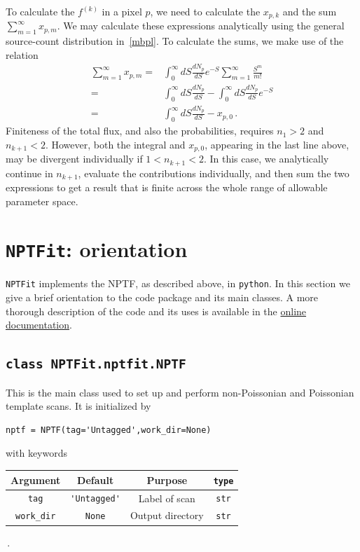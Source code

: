To calculate the $f^{(k)}$ in a pixel $p$, we need to calculate the $x_{p,k}$ and the sum $\sum_{m=1}^\infty x_{p,m}$.  We may calculate these expressions analytically using the general source-count distribution in~\eqref{mbpl}.  To calculate the sums, we make use of the relation 
\begin{equation}\begin{aligned}
\sum_{m=1}^{\infty} x_{p,m} = &\int_0^{\infty} dS \frac{dN_p}{dS} e^{-S} \sum_{m=1}^{\infty} \frac{S^m}{m!} \\
= &\int_0^{\infty} dS \frac{dN_p}{dS} - \int_0^{\infty} dS \frac{dN_p}{dS} e^{-S} \\
= &\int_0^{\infty} dS \frac{dN_p}{dS} - x_{p,0}\,.
\end{aligned}
\label{eq:xmsum}
\end{equation}
Finiteness of the total flux, and also the probabilities, requires $n_1 > 2$ and $n_{k+1} < 2$.  However,  
both the integral and $x_{p,0}$, appearing in the last line above, may be divergent individually if $1 < n_{k+1} < 2$.  In this case, we analytically continue in $n_{k+1}$, evaluate the contributions individually, and then sum the two expressions to get a result that is finite across the whole range of allowable parameter space. %

\section{\texttt{NPTFit}: orientation}
\label{NPTFit-orientation}

\texttt{NPTFit} implements the NPTF, as described above, in \texttt{python}.  In this section we give a brief orientation to the code package and its main classes.  A more thorough description of the code and its uses is available in the \href{http://nptfit.readthedocs.io}{online documentation}.

\subsection*{ \lstinline{class NPTFit.nptfit.NPTF} }

This is the main class used to set up and perform non-Poissonian and Poissonian template scans.  It is initialized by   
\begin{lstlisting}
nptf = NPTF(tag='Untagged',work_dir=None)
\end{lstlisting}
with keywords 
\begin{center}
\begin{tabular}{ cccc}
\toprule
Argument &  Default & Purpose & \lstinline!type! \\ 
\midrule
\lstinline!tag! & \lstinline!'Untagged'! & Label of scan & \lstinline!str! \\  
\lstinline!work_dir! & \lstinline!None! & Output directory & \lstinline!str!  \\  
\bottomrule
\end{tabular} \,.
\end{center}


